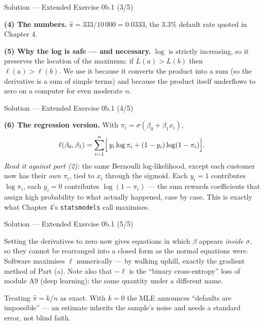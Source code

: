 \documentclass[aspectratio=169,11pt]{beamer}
\begin{document}
\begin{frame}{Solution --- Extended Exercise 0b.1 (3/5)}
  \begin{solutionbox}
    \scriptsize
    \textbf{(4) The numbers.} $\hat\pi = 333/10\,000 = \mathbf{0.0333}$, the
    $3.3\%$ default rate quoted in Chapter 4.

    \textbf{(5) Why the log is safe --- and necessary.} $\log$ is strictly
    increasing, so it preserves the location of the maximum: if
    $L(a) > L(b)$ then $\ell(a) > \ell(b)$. We use it because it converts the
    product into a sum (so the derivative is a sum of simple terms) and because
    the product itself underflows to zero on a computer for even moderate $n$.
  \end{solutionbox}
\end{frame}

\begin{frame}{Solution --- Extended Exercise 0b.1 (4/5)}
  \begin{solutionbox}
    \textbf{(6) The regression version.} With
    $\pi_i = \sigma(\beta_0 + \beta_1 x_i)$,
    \[
      \ell(\beta_0,\beta_1) = \sum_{i=1}^{n}
        \Bigl[\,y_i \log \pi_i + (1-y_i)\log(1-\pi_i)\Bigr].
    \]
    \emph{Read it against part (2):} the same Bernoulli log-likelihood,
    except each customer now has their \emph{own} $\pi_i$, tied to $x_i$
    through the sigmoid. Each $y_i=1$ contributes $\log\pi_i$, each
    $y_i=0$ contributes $\log(1-\pi_i)$ --- the sum rewards coefficients
    that assign high probability to what actually happened, case by case.
    This is exactly what Chapter 4's \texttt{statsmodels} call maximises.
  \end{solutionbox}
\end{frame}

\begin{frame}{Solution --- Extended Exercise 0b.1 (5/5)}
  \begin{solutionbox}
    Setting the derivatives to zero now gives equations in which
    $\beta$ appears \emph{inside} $\sigma$, so they cannot be rearranged into
    a closed form as the normal equations were. Software maximises $\ell$
    numerically --- by walking uphill, exactly the gradient method of
    Part (a). Note also that $-\ell$ is the ``binary cross-entropy'' loss of
    module A9 (deep learning): the same quantity under a different name.
  \end{solutionbox}
  \begin{mistake}
    Treating $\hat\pi = k/n$ as exact. With $k=0$
    the MLE announces ``defaults are impossible'' --- an estimate inherits the
    sample's noise and needs a standard error, not blind faith.
  \end{mistake}
\end{frame}
\end{document}
